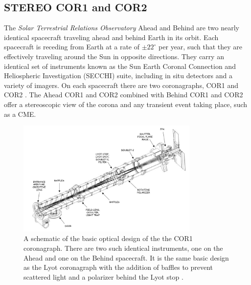 \subsection{STEREO COR1 and COR2}\label{sec:22}
The \emph{Solar Terrestrial Relations Observatory} \citep[\emph{STEREO};][]{kai08} Ahead and Behind are two nearly identical spacecraft traveling ahead and behind Earth in its orbit. Each spacecraft is receding from Earth at a rate of $\pm22^{\circ}$ per year, such that they are effectively traveling around the Sun in opposite directions. They carry an identical set of instruments known as the Sun Earth Coronal Connection and Heliospheric Investigation (SECCHI) suite, including in situ detectors and a variety of imagers. On each spacecraft there are two coronagraphs, COR1 and COR2 \citep{how08}. The Ahead COR1 and COR2 combined with Behind COR1 and COR2 offer a stereoscopic view of the corona and any transient event taking place, such as a CME.
\begin{figure}[!t]
\begin{center}
\includegraphics[width=0.8\textwidth]{images/COR1_design}
\caption[The COR1 coronagraph]{A schematic of the basic optical design of the the COR1 coronagraph. There are two such identical instruments, one on the Ahead and one on the Behind spacecraft. It is the same basic design as the Lyot coronagraph with the addition of baffles to prevent scattered light and a polarizer behind the Lyot stop \citep{thomp2008}.}
\label{fig:COR1_design}
\end{center}
\end{figure}
